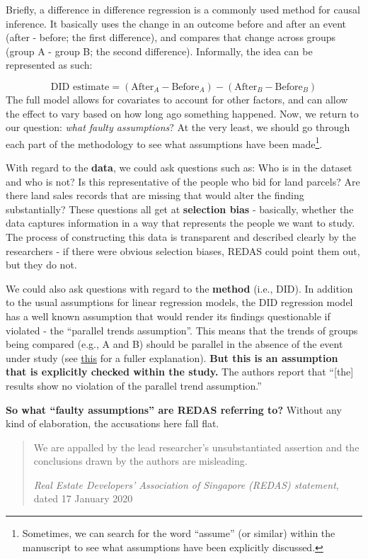 \documentclass[openany]{book}
\let\rmarkdownfootnote\footnote%
\def\footnote{\protect\rmarkdownfootnote}
\begin{document}
Briefly, a difference in difference regression is a commonly used method
for causal inference. It basically uses the change in an outcome before
and after an event (after - before; the first difference), and compares
that change across groups (group A - group B; the second difference).
Informally, the idea can be represented as such:

\[
\text{DID estimate} = (\text{After}_A-\text{Before}_A) - (\text{After}_B-\text{Before}_B) 
\] The full model allows for covariates to account for other factors,
and can allow the effect to vary based on how long ago something
happened. Now, we return to our question: \emph{what faulty
assumptions}? At the very least, we should go through each part of the
methodology to see what assumptions have been made\footnote{Sometimes,
  we can search for the word ``assume'' (or similar) within the
  manuscript to see what assumptions have been explicitly discussed.}.

With regard to the \textbf{data}, we could ask questions such as: Who is
in the dataset and who is not? Is this representative of the people who
bid for land parcels? Are there land sales records that are missing that
would alter the finding substantially? These questions all get at
\textbf{selection bias} - basically, whether the data captures
information in a way that represents the people we want to study. The
process of constructing this data is transparent and described clearly
by the researchers - if there were obvious selection biases, REDAS could
point them out, but they do not.

We could also ask questions with regard to the \textbf{method} (i.e.,
DID). In addition to the usual assumptions for linear regression models,
the DID regression model has a well known assumption that would render
its findings questionable if violated - the ``parallel trends
assumption''. This means that the trends of groups being compared (e.g.,
A and B) should be parallel in the absence of the event under study (see
\href{https://www.mailman.columbia.edu/research/population-health-methods/difference-difference-estimation}{this}
for a fuller explanation). \textbf{But this is an assumption that is
explicitly checked within the study.} The authors report that
``{[}the{]} results show no violation of the parallel trend
assumption.''

\textbf{So what ``faulty assumptions'' are REDAS referring to?} Without
any kind of elaboration, the accusations here fall flat.

\begin{quote}
We are appalled by the lead researcher's unsubstantiated assertion and
the conclusions drawn by the authors are misleading.

\emph{Real Estate Developers' Association of Singapore (REDAS)
statement}, dated 17 January 2020
\end{quote}
\end{document}
